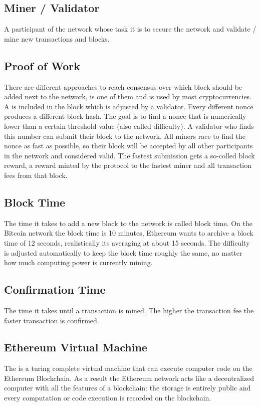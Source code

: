 \subsection{Miner / Validator}
A participant of the network whose task it is to secure the network and validate / mine new transactions and blocks.
\\

\subsection{Proof of Work}
There are different approaches to reach consensus over which block should be added next to the network,  is one of them and is used by most cryptocurrencies. A  is included in the block which is adjusted by a validator. Every different nonce produces a different block hash. The goal is to find a nonce that is numerically lower than a certain threshold value (also called difficulty). A validator who finds this number can submit their block to the network. All miners race to find the nonce as fast as possible, so their block will be accepted by all other participants in the network and considered valid. The fastest submission gets a so-colled block reward, a reward minted by the protocol to the fastest miner and all transaction fees from that block.
\\

\subsection{Block Time}
The time it takes to add a new block to the network is called block time. On the Bitcoin network the block time is 10 minutes\cite{bitcoin-whitepaper}, Ethereum wants to archive a block time of 12 seconds\cite{ethereum-blocktime}, realistically its averaging at about 15 seconds\cite{ethereum-blocktime-chart}. The difficulty is adjusted automatically to keep the block time roughly the same, no matter how much computing power is currently mining.
\\

\subsection{Confirmation Time}
The time it takes until a transaction is mined. The higher the transaction fee the faster transaction is confirmed.
\\

\subsection{Ethereum Virtual Machine}
The  is a turing complete virtual machine that can execute computer code on the Ethereum Blockchain. As a result the Ethereum network acts like a decentralized computer with all the features of a blockchain: the storage is entirely public and every computation or code execution is recorded on the blockchain.
\\

